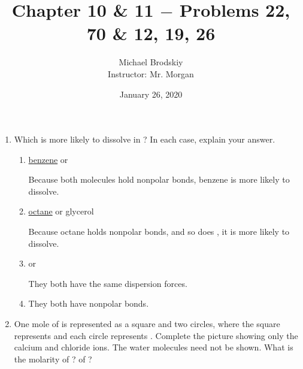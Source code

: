 \documentclass[12pt]{article}
\title{Chapter 10 \& 11 $-$ Problems 22, 70 \& 12, 19, 26}
\date{January 26, 2020}
\author{Michael Brodskiy\\ \small Instructor: Mr. Morgan}
\begin{document}
\maketitle

\begin{enumerate}

    \begin{center}
      \underline{Chapter 10}
    \end{center}

    \setcounter{enumi}{21}

  \item Which is more likely to dissolve in ? In each case, explain your answer.

    \begin{enumerate}

      \item \underline{benzene} or 

        \begin{center}
          Because both molecules hold nonpolar bonds, benzene is more likely to dissolve.
        \end{center}

      \item \underline{octane} or glycerol

        \begin{center}
          Because octane holds nonpolar bonds, and so does , it is more likely to dissolve.
        \end{center}

      \item \underline{} or 

        \begin{center}
           They both have the same dispersion forces.
        \end{center}

      \item \underline{} 

        \begin{center}
          They both have nonpolar bonds.
        \end{center}

    \end{enumerate}

    \setcounter{enumi}{69}

  \item One mole of  is represented as a square and two circles, where the square represents  and each circle represents . Complete the picture showing only the calcium and chloride ions. The water molecules need not be shown. What is the molarity of ? of ?


\end{enumerate}
\end{document}
